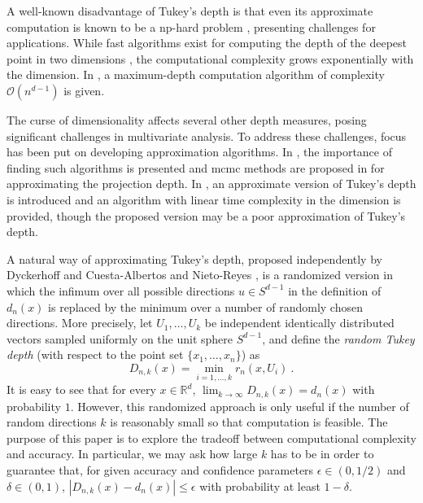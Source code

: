 \documentclass[12pt]{article}
\newcommand{\R}{\mathbb{R}}
\begin{document}
A well-known disadvantage of Tukey's depth is that even its
approximate computation is known to be a {\sc np}-hard problem \cite{AmKa95,BrChIaLaMo08,JOHNSON197893}, presenting challenges for applications. While fast algorithms exist for computing the depth of the deepest point in two dimensions \cite{chan2004optimal}, the computational complexity grows exponentially with the dimension. In \cite{chan2004optimal}, a maximum-depth computation algorithm of complexity $\mathcal{O}(n^{d-1})$ is given.



The curse of dimensionality affects several other depth measures,
posing significant challenges in multivariate analysis. To address
these challenges, focus has been put on developing approximation
algorithms. In \cite{MR4207999}, the importance of finding such algorithms is presented and {\sc mcmc} methods are proposed in \cite{SHAO2022114278} for approximating the projection depth. In \cite{Zuo19newapproach}, an approximate version of Tukey's depth is introduced and an algorithm with linear time complexity in the dimension is provided, though the proposed version may be a poor approximation
of Tukey's depth. 

A natural way of approximating Tukey's depth, proposed independently
by Dyckerhoff \cite{Dyc04} and Cuesta-Albertos and Nieto-Reyes \cite{cuesta2008random},
is a randomized version in which the infimum over all possible directions $u\in S^{d-1}$ in the definition of $d_n(x)$ is replaced by the minimum over a number of randomly chosen directions.
More precisely, let $U_1,\ldots,U_k$ be independent identically distributed vectors sampled uniformly on the unit sphere $S^{d-1}$, and define the \emph{random Tukey depth} (with respect to the point set $\{x_1,\ldots,x_n\}$) as
\[
  D_{n,k}(x)  = \min_{i=1,\ldots,k} r_n(x,U_i)~.
\]
It is easy to see that for every $x\in\R^d$, $\lim_{k\to\infty} D_{n,k}(x) = d_n(x)$ with probability $1$. However, this randomized approach is only useful if the number of random directions
$k$ is reasonably small so that computation is feasible. The purpose of this paper is to explore the
tradeoff between computational complexity and accuracy. In particular, we may ask how large $k$ has to be
in order to guarantee that, for given accuracy and confidence parameters $\epsilon \in (0,1/2)$ and $\delta\in (0,1)$,  
$|D_{n,k}(x)-d_n(x)|\le \epsilon$ with probability at least $1-\delta$.
\end{document}
